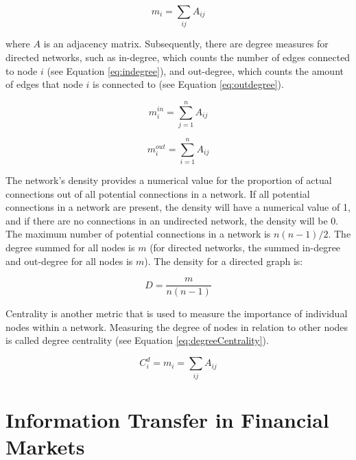 \begin{equation}
    \label{eq:degree}
    m_i =  \sum_{ij}A_{ij}
\end{equation}

 \noindent where \(A\) is an adjacency matrix. Subsequently, there are degree measures for directed networks, such as in-degree, which counts the number of edges connected to node \(i\) (see Equation \ref{eq:indegree}), and out-degree, which counts the amount of edges that node \(i\) is connected to (see Equation \ref{eq:outdegree}).

\begin{equation}
    \label{eq:indegree}
    m_i^{in} =  \sum_{j=1}^{n}A_{ij}
\end{equation}

\begin{equation}
    \label{eq:outdegree}
    m_i^{out} =  \sum_{i=1}^{n}A_{ij}
\end{equation}

\noindent The network's density provides a numerical value for the proportion of actual connections out of all potential connections in a network. If all potential connections in a network are present,  the density will have a numerical value of 1, and if there are no connections in an undirected network, the density will be 0. The maximum number of potential connections in a network is \(n(n-1)/2\).  The degree summed for all nodes is \(m\) (for directed networks, the summed in-degree and out-degree for all nodes is \(m\)). The density for a directed graph is:

\begin{equation}
    \label{eq:density}
    D = \frac{m}{n (n-1)}
\end{equation}

Centrality is another metric that is used to measure the importance of individual nodes within a network. Measuring the degree of nodes in relation to other nodes is called degree centrality (see Equation \ref{eq:degreeCentrality}). 

\begin{equation}
    \label{eq:degreeCentrality}
    C_i^d =  m_i = \sum_{ij}A_{ij}
\end{equation}


\section{Information Transfer in Financial Markets} \label{IFinFM}

